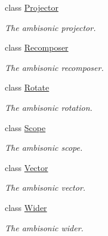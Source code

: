 \begin{DoxyCompactItemize}
class \hyperlink{class_hoa2_d_1_1_projector}{Projector}
\begin{DoxyCompactList}\small\item\em The ambisonic projector. \end{DoxyCompactList}\item 
class \hyperlink{class_hoa2_d_1_1_recomposer}{Recomposer}
\begin{DoxyCompactList}\small\item\em The ambisonic recomposer. \end{DoxyCompactList}\item 
class \hyperlink{class_hoa2_d_1_1_rotate}{Rotate}
\begin{DoxyCompactList}\small\item\em The ambisonic rotation. \end{DoxyCompactList}\item 
class \hyperlink{class_hoa2_d_1_1_scope}{Scope}
\begin{DoxyCompactList}\small\item\em The ambisonic scope. \end{DoxyCompactList}\item 
class \hyperlink{class_hoa2_d_1_1_vector}{Vector}
\begin{DoxyCompactList}\small\item\em The ambisonic vector. \end{DoxyCompactList}\item 
class \hyperlink{class_hoa2_d_1_1_wider}{Wider}
\begin{DoxyCompactList}\small\item\em The ambisonic wider. \end{DoxyCompactList}\end{DoxyCompactItemize}
